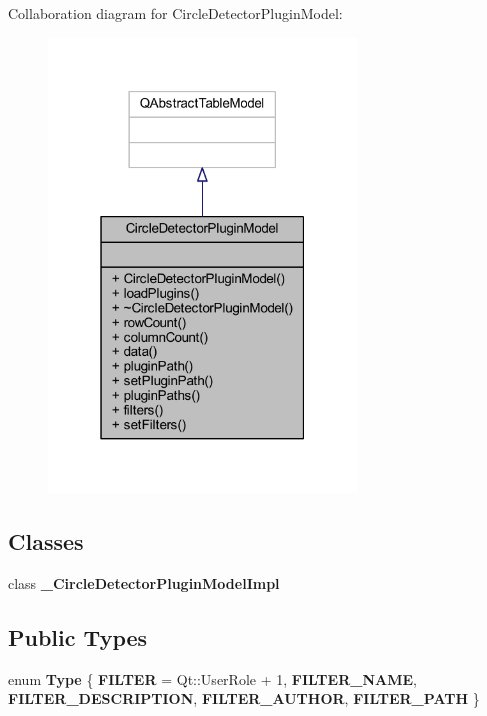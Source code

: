 Collaboration diagram for Circle\+Detector\+Plugin\+Model\+:\nopagebreak
\begin{figure}[H]
\begin{center}
\leavevmode
\includegraphics[width=232pt]{d0/d73/class_circle_detector_plugin_model__coll__graph}
\end{center}
\end{figure}
\subsection*{Classes}
\begin{DoxyCompactItemize}
\item 
class {\bfseries \+\_\+\+Circle\+Detector\+Plugin\+Model\+Impl}
\end{DoxyCompactItemize}
\subsection*{Public Types}
\begin{DoxyCompactItemize}
\item 
\mbox{\label{class_circle_detector_plugin_model_a40fe8ab5c9722199aa94febf4e1ea6f0}} 
enum {\bfseries Type} \{ \newline
{\bfseries F\+I\+L\+T\+ER} = Qt\+:\+:User\+Role + 1, 
{\bfseries F\+I\+L\+T\+E\+R\+\_\+\+N\+A\+ME}, 
{\bfseries F\+I\+L\+T\+E\+R\+\_\+\+D\+E\+S\+C\+R\+I\+P\+T\+I\+ON}, 
{\bfseries F\+I\+L\+T\+E\+R\+\_\+\+A\+U\+T\+H\+OR}, 
\newline
{\bfseries F\+I\+L\+T\+E\+R\+\_\+\+P\+A\+TH}
 \}
\end{DoxyCompactItemize}
